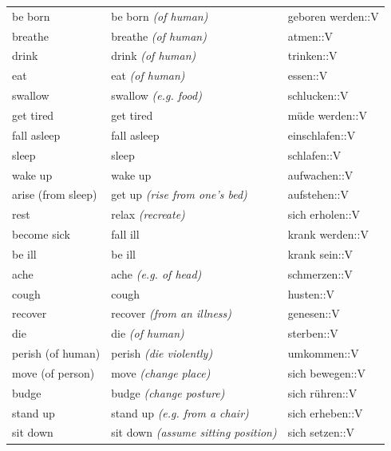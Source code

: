 \begin{center}
\begin{longtable}{lll}
{\sc \lowercase{	BE BORN	}}	&	be born	\textit{\footnotesize (of human)}	&	geboren werden::V	\\
{\sc \lowercase{	BREATHE	}}	&	breathe	\textit{\footnotesize (of human)}	&	atmen::V	\\
{\sc \lowercase{	DRINK	}}	&	drink	\textit{\footnotesize (of human)}	&	trinken::V	\\
{\sc \lowercase{	EAT	}}	&	eat	\textit{\footnotesize (of human)}	&	essen::V	\\
{\sc \lowercase{	SWALLOW	}}	&	swallow	\textit{\footnotesize (e.g. food)}	&	schlucken::V	\\
{\sc \lowercase{	GET TIRED	}}	&	get tired		&	müde werden::V	\\
{\sc \lowercase{	FALL ASLEEP	}}	&	fall asleep		&	einschlafen::V	\\
{\sc \lowercase{	SLEEP	}}	&	sleep		&	schlafen::V	\\
{\sc \lowercase{	WAKE UP	}}	&	wake up		&	aufwachen::V	\\
{\sc \lowercase{	ARISE \footnotesize (FROM SLEEP)	}}	&	get up	\textit{\footnotesize (rise from one's bed)}	&	aufstehen::V	\\
{\sc \lowercase{	REST	}}	&	relax	\textit{\footnotesize (recreate)}	&	sich erholen::V	\\
{\sc \lowercase{	BECOME SICK	}}	&	fall ill		&	krank werden::V	\\
{\sc \lowercase{	BE ILL	}}	&	be ill		&	krank sein::V	\\
{\sc \lowercase{	ACHE	}}	&	ache	\textit{\footnotesize (e.g. of head)}	&	schmerzen::V	\\
{\sc \lowercase{	COUGH	}}	&	cough		&	husten::V	\\
{\sc \lowercase{	RECOVER	}}	&	recover	\textit{\footnotesize (from an illness)}	&	genesen::V	\\
{\sc \lowercase{	DIE	}}	&	die	\textit{\footnotesize (of human)}	&	sterben::V	\\
{\sc \lowercase{	PERISH \footnotesize (OF HUMAN)	}}	&	perish	\textit{\footnotesize (die violently)}	&	umkommen::V	\\
{\sc \lowercase{	MOVE \footnotesize (OF PERSON)	}}	&	move	\textit{\footnotesize (change place)}	&	sich bewegen::V	\\
{\sc \lowercase{	BUDGE	}}	&	budge	\textit{\footnotesize (change posture)}	&	sich rühren::V	\\
{\sc \lowercase{	STAND UP	}}	&	stand up	\textit{\footnotesize (e.g. from a chair)}	&	sich erheben::V	\\
{\sc \lowercase{	SIT DOWN	}}	&	sit down	\textit{\footnotesize (assume sitting position)}	&	sich setzen::V	\\

\end{longtable}
\end{center}
